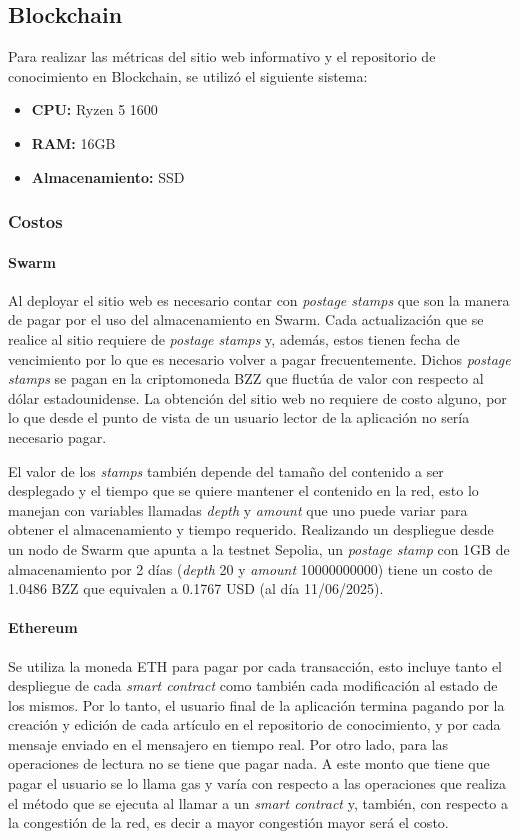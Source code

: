 \subsection{Blockchain}

Para realizar las métricas del sitio web informativo y el repositorio de conocimiento en Blockchain, se utilizó el siguiente sistema:
\begin{itemize}
    \item \textbf{CPU:} Ryzen 5 1600
    \item \textbf{RAM:} 16GB
    \item \textbf{Almacenamiento:} SSD
\end{itemize}

\subsubsection{Costos}

\paragraph{Swarm}
Al deployar el sitio web es necesario contar con \textit{postage stamps} que son la manera de pagar por el uso del almacenamiento en Swarm. Cada actualización que se realice al sitio requiere de \textit{postage stamps} y, además, estos tienen fecha de vencimiento por lo que es necesario volver a pagar frecuentemente. Dichos \textit{postage stamps} se pagan en la criptomoneda BZZ que fluctúa de valor con respecto al dólar estadounidense. La obtención del sitio web no requiere de costo alguno, por lo que desde el punto de vista de un usuario lector de la aplicación no sería necesario pagar.

El valor de los \textit{stamps} también depende del tamaño del contenido a ser desplegado y el tiempo que se quiere mantener el contenido en la red, esto lo manejan con variables llamadas \textit{depth} y \textit{amount} que uno puede variar para obtener el almacenamiento y tiempo requerido. Realizando un despliegue desde un nodo de Swarm que apunta a la testnet Sepolia, un \textit{postage stamp} con 1GB de almacenamiento por 2 días (\textit{depth} 20 y \textit{amount} 10000000000) tiene un costo de 1.0486 BZZ que equivalen a 0.1767 USD (al día 11/06/2025).

\paragraph{Ethereum}
Se utiliza la moneda ETH para pagar por cada transacción, esto incluye tanto el despliegue de cada \textit{smart contract} como también cada modificación al estado de los mismos. Por lo tanto, el usuario final de la aplicación termina pagando por la creación y edición de cada artículo en el repositorio de conocimiento, y por cada mensaje enviado en el mensajero en tiempo real. Por otro lado, para las operaciones de lectura no se tiene que pagar nada. A este monto que tiene que pagar el usuario se lo llama gas y varía con respecto a las operaciones que realiza el método que se ejecuta al llamar a un \textit{smart contract} y, también, con respecto a la congestión de la red, es decir a mayor congestión mayor será el costo.

